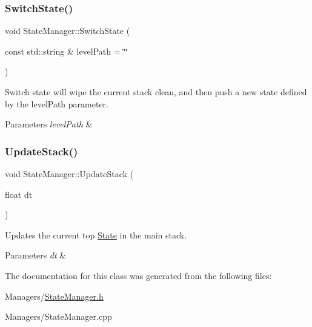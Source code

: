 \subsubsection{\texorpdfstring{Switch\+State()}{SwitchState()}}
{\footnotesize\ttfamily void State\+Manager\+::\+Switch\+State (\begin{DoxyParamCaption}\item[{const std\+::string \&}]{level\+Path = {\ttfamily \char`\"{}\char`\"{}} }\end{DoxyParamCaption})}



Switch state will wipe the current stack clean, and then push a new state defined by the level\+Path parameter. 


\begin{DoxyParams}{Parameters}
{\em level\+Path} & \\
\hline
\end{DoxyParams}
\mbox{\label{classStateManager_a5e4bd4cb8c5928d33a04506dc8c8f350}} 
\subsubsection{\texorpdfstring{Update\+Stack()}{UpdateStack()}}
{\footnotesize\ttfamily void State\+Manager\+::\+Update\+Stack (\begin{DoxyParamCaption}\item[{float}]{dt }\end{DoxyParamCaption})}



Updates the current top \hyperlink{classState}{State} in the main stack. 


\begin{DoxyParams}{Parameters}
{\em dt} & \\
\hline
\end{DoxyParams}


The documentation for this class was generated from the following files\+:\begin{DoxyCompactItemize}
\item 
Managers/\hyperlink{StateManager_8h}{State\+Manager.\+h}\item 
Managers/State\+Manager.\+cpp\end{DoxyCompactItemize}
